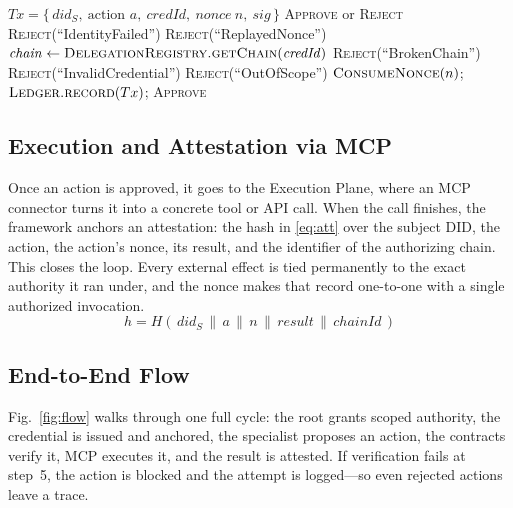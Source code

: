 \documentclass[conference]{IEEEtran}
\begin{document}
\begin{algorithm}[t]
\caption{Action Authorization}
\label{alg:auth}
\begin{algorithmic}[1]
\Require $Tx = \{\, \mathit{did}_S,\ \text{action } a,\ \mathit{credId},\ \mathit{nonce}\ n,\ \mathit{sig} \,\}$
\Ensure \textsc{Approve} or \textsc{Reject}
    \State \Return \textsc{Reject}(``IdentityFailed'')
\EndIf
{}
    \State \Return \textsc{Reject}(``ReplayedNonce'')
\EndIf
\State $\mathit{chain} \gets \textsc{DelegationRegistry.getChain}(\mathit{credId})$
    \State \Return \textsc{Reject}(``BrokenChain'')
\EndIf
{}
        \State \Return \textsc{Reject}(``InvalidCredential'')
    \EndIf
\EndFor
{}
    \State \Return \textsc{Reject}(``OutOfScope'')
\EndIf
\State $\textsc{ConsumeNonce}(n)$; \ $\textsc{Ledger.record}(Tx)$; \Return \textsc{Approve}
\end{algorithmic}
\end{algorithm}

\subsection{Execution and Attestation via MCP}
Once an action is approved, it goes to the Execution Plane, where an MCP connector turns it into a concrete tool or API call. When the call finishes, the framework anchors an attestation: the hash in \eqref{eq:att} over the subject DID, the action, the action's nonce, its result, and the identifier of the authorizing chain. This closes the loop. Every external effect is tied permanently to the exact authority it ran under, and the nonce makes that record one-to-one with a single authorized invocation.
\begin{equation}\label{eq:att}
h = H(\, \mathit{did}_S \,\|\, a \,\|\, n \,\|\, \mathit{result} \,\|\, \mathit{chainId} \,)
\end{equation}

\subsection{End-to-End Flow}
Fig.~\ref{fig:flow} walks through one full cycle: the root grants scoped authority, the credential is issued and anchored, the specialist proposes an action, the contracts verify it, MCP executes it, and the result is attested. If verification fails at step~5, the action is blocked and the attempt is logged---so even rejected actions leave a trace.
\end{document}
